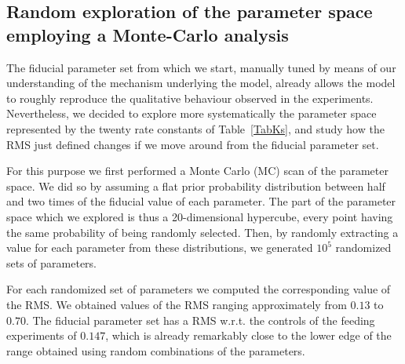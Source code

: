\documentclass[oneside, 10pt, a4paper, twocolumn]{article}
\begin{document}
\subsection{Random exploration of the parameter space employing a Monte-Carlo analysis}

The fiducial parameter set from which we start, manually tuned by means of our understanding of the mechanism underlying the model, already allows the model to roughly reproduce the qualitative behaviour observed in the experiments. Nevertheless, we decided to explore more systematically the parameter space represented by the twenty rate constants of Table~\ref{TabKs}, and study how the RMS just defined changes if we move around from the fiducial parameter set.


For this purpose we first performed a Monte Carlo (MC) scan of the parameter space. 
We did so by assuming a flat prior probability distribution between half and two times of the fiducial value of each parameter. The part of the parameter space which we explored is thus a 20-dimensional hypercube, every point having the same probability of being randomly selected.
Then, by randomly extracting a value for each parameter from these distributions, we generated $10^5$ randomized sets of parameters.

For each randomized set of parameters we computed the corresponding value of the RMS. We obtained values of the RMS ranging approximately from $0.13$ to $0.70$. 
The fiducial parameter set has a RMS w.r.t. the controls of the feeding experiments of $0.147$, which is already remarkably close to the lower edge of the range obtained using random combinations of the parameters. 

\end{document}

